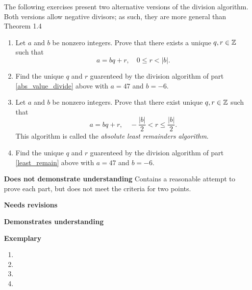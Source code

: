 \documentclass[letterpaper, 11pt]{ximera}
\begin{document}
\begin{ex} The following exercises present two alternative versions of the division algorithm. Both versions allow negative divisors; as such, they are more general than Theorem 1.4
	\begin{enumerate}[label=(\alph*)]
		\item\label{abs_value_divide} Let $a$ and $b$ be nonzero integers. Prove that there exists a unique $q,r\in\mathbb Z$ such that 
		\[a=bq+r, \quad 0\leq r <|b|.\]
		\item Find the unique $q$ and $r$ guarenteed by the division algorithm of part \ref{abs_value_divide} above with $a=47$ and $b=-6$.
		\item\label{least_remain} Let $a$ and $b$ be nonzero integers. Prove that there exist unique $q,r\in\mathbb Z$ such that 
		\[a=bq+r,\quad -\frac{|b|}{2}<r\leq \frac{|b|}{2}.\] 
		This algorithm is called the \emph{absolute least remainders algorithm}.
		\item Find the unique $q$ and $r$ guarenteed by the division algorithm of part \ref{least_remain} above with $a=47$ and $b=-6$.
	\end{enumerate}
\end{ex}

\begin{writeRubric}
    \item \textbf{Does not demonstrate understanding}
     Contains a reasonable attempt to prove each part, but does not meet the criteria for two points.
    \item \textbf{Needs revisions}
     
    \item \textbf{Demonstrates understanding}
    
    \item \textbf{Exemplary}
        
\end{writeRubric}
                                       	
\begin{solution}
 \begin{enumerate}[label=(\alph*)]
		\item %
		\item %
		\item %
		\item %
\end{enumerate}

\end{solution}
\end{document}
